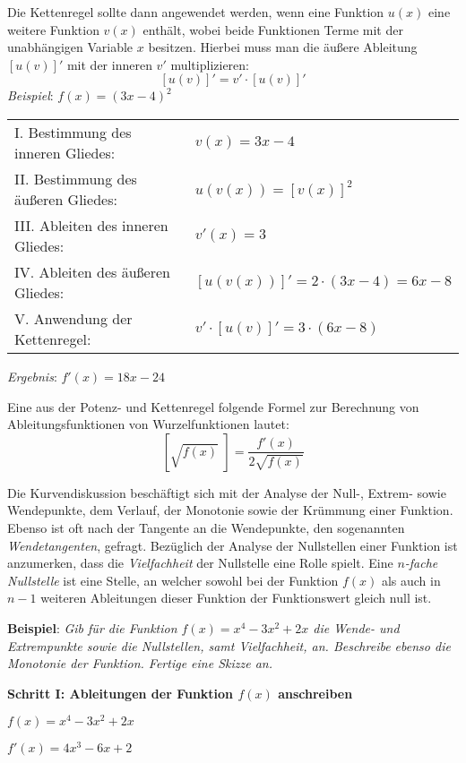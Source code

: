 \pagebreak


Die Kettenregel sollte dann angewendet werden, wenn eine Funktion $u(x)$ eine weitere Funktion $v(x)$ enth\"{a}lt, wobei beide Funktionen Terme mit der unabh\"{a}ngigen Variable $x$ besitzen. Hierbei muss man die \"{a}u\ss{}ere Ableitung $[u(v)]'$ mit der inneren $v'$ multiplizieren: $$[u(v)]' = v' \cdot [u(v)]'$$
\emph{Beispiel}: $f(x) = (3x - 4)^2$

\begin{tabular}{l l}
	I. Bestimmung des inneren Gliedes: & $v(x) = 3x - 4$
	\extrapar \\
	II. Bestimmung des \"{a}u\ss{}eren Gliedes: & $u(v(x)) = [v(x)]^2$
	\extrapar \\
	III. Ableiten des inneren Gliedes: & $v'(x) = 3$
	\extrapar \\
	IV. Ableiten des \"{a}u\ss{}eren Gliedes: & $[u(v(x))]' = 2 \cdot (3x - 4) = 6x - 8$
	\extrapar \\
	V. Anwendung der Kettenregel: & $v' \cdot [u(v)]' = 3 \cdot (6x - 8)$
\end{tabular}

\emph{Ergebnis}: $f'(x) = 18x - 24$

Eine aus der Potenz- und Kettenregel folgende Formel zur Berechnung von Ableitungsfunktionen von Wurzelfunktionen lautet: $$\left[\sqrt{f(x)}\,\,\right] = \frac{f'(x)}{2\sqrt{f(x)}}$$

Die Kurvendiskussion besch\"{a}ftigt sich mit der Analyse der Null-, Extrem- sowie Wendepunkte, dem Verlauf, der Monotonie sowie der Kr\"{u}mmung einer Funktion. Ebenso ist oft nach der Tangente an die Wendepunkte, den sogenannten \emph{Wendetangenten}, gefragt. Bez\"{u}glich der Analyse der Nullstellen einer Funktion ist anzumerken, dass die \emph{Vielfachheit} der Nullstelle eine Rolle spielt. Eine \emph{$n$-fache Nullstelle} ist eine Stelle, an welcher sowohl bei der Funktion $f(x)$ als auch in $n-1$ weiteren Ableitungen dieser Funktion der Funktionswert gleich null ist. 

\textbf{Beispiel}: \emph{Gib f\"{u}r die Funktion $f(x) = x^4 - 3x^2 + 2x$ die Wende- und Extrempunkte sowie die Nullstellen, samt Vielfachheit, an. Beschreibe ebenso die Monotonie der Funktion. Fertige eine Skizze an.}

\textbf{Schritt I: Ableitungen der Funktion $f(x)$ anschreiben}

$f(x) = x^4 - 3x^2 + 2x$

$f'(x) = 4x^3 - 6x + 2$

